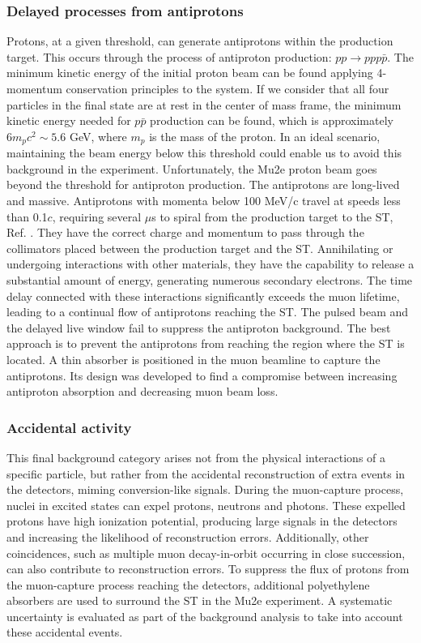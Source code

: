 \subsubsection{Delayed processes from antiprotons}
Protons, at a given threshold, can generate antiprotons within the production target. This occurs through the process of antiproton production: $pp \rightarrow ppp\bar{p}$. The minimum kinetic energy of the initial proton beam can be found applying 4-momentum conservation principles to the system. 
If we consider that all four particles in the final state are at rest in the center of mass frame, the minimum kinetic energy needed for $p\bar{p}$ production can be found, which is approximately $6 m_pc^2 \sim 5.6$ GeV, where $m_p$ is the mass of the proton. In an ideal scenario, maintaining the beam energy below this threshold could enable us to avoid this background in the experiment. Unfortunately, the Mu2e proton beam goes beyond the threshold for antiproton production. The antiprotons are long-lived and massive. Antiprotons with momenta below 100 MeV/c travel at speeds less than 0.1$c$, requiring several $\mu$s to spiral from the production target to the ST, Ref. \cite{bartoszek2015mu2e}. They have the correct charge and momentum to pass through the collimators placed between the production target and the ST. Annihilating or undergoing interactions with other materials, they have the capability to release a substantial amount of energy, generating numerous secondary electrons. The time delay connected with these interactions significantly exceeds the muon lifetime, leading to a continual flow of antiprotons reaching the ST. The pulsed beam and the delayed live window fail to suppress the antiproton background. The best approach is to prevent the antiprotons from reaching the region where the ST is located. A thin absorber is positioned in the muon beamline to capture the antiprotons. Its design was developed to find a compromise between increasing antiproton absorption and decreasing muon beam loss.
\subsubsection{Accidental activity}
This final background category arises not from the physical interactions of a specific particle, but rather from the accidental reconstruction of extra events in the detectors, miming conversion-like signals. During the muon-capture process, nuclei in excited states can expel protons, neutrons and photons. These expelled protons have high ionization potential, producing large signals in the detectors and increasing the likelihood of reconstruction errors. Additionally, other coincidences, such as multiple muon decay-in-orbit occurring in close succession, can also contribute to reconstruction errors. To suppress the flux of protons from the muon-capture process reaching the detectors, additional polyethylene absorbers are used to surround the ST in the Mu2e experiment. A systematic uncertainty is evaluated as part of the background analysis to take into account these accidental events.

